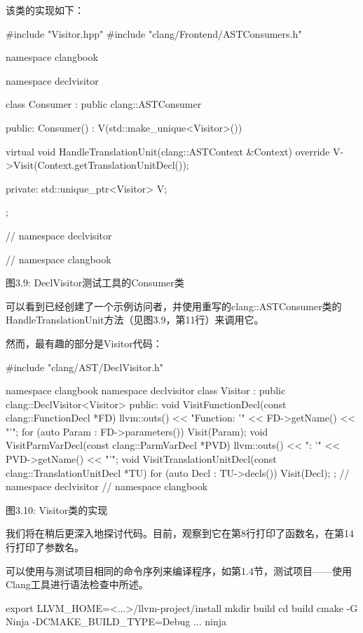 该类的实现如下：

\begin{cpp}
#include "Visitor.hpp"
#include "clang/Frontend/ASTConsumers.h"

namespace clangbook {
namespace declvisitor {
class Consumer : public clang::ASTConsumer {
public:
  Consumer() : V(std::make_unique<Visitor>()) {}

  virtual void HandleTranslationUnit(clang::ASTContext &Context) override {
    V->Visit(Context.getTranslationUnitDecl());
  }

private:
  std::unique_ptr<Visitor> V;
};
} // namespace declvisitor
} // namespace clangbook
\end{cpp}

\begin{center}
图3.9: DeclVisitor测试工具的Consumer类
\end{center}

可以看到已经创建了一个示例访问者，并使用重写的clang::ASTConsumer类的HandleTranslationUnit方法（见图3.9，第11行）来调用它。

然而，最有趣的部分是Visitor代码：

\begin{cpp}
#include "clang/AST/DeclVisitor.h"

namespace clangbook {
namespace declvisitor {
class Visitor : public clang::DeclVisitor<Visitor> {
public:
  void VisitFunctionDecl(const clang::FunctionDecl *FD) {
    llvm::outs() << "Function: '" << FD->getName() << "'\n";
    for (auto Param : FD->parameters()) {
      Visit(Param);
    }
  }
  void VisitParmVarDecl(const clang::ParmVarDecl *PVD) {
    llvm::outs() << "\tParameter: '" << PVD->getName() << "'\n";
  }
  void VisitTranslationUnitDecl(const clang::TranslationUnitDecl *TU) {
    for (auto Decl : TU->decls()) {
      Visit(Decl);
    }
  }
};
} // namespace declvisitor
} // namespace clangbook
\end{cpp}

\begin{center}
图3.10: Visitor类的实现
\end{center}

我们将在稍后更深入地探讨代码。目前，观察到它在第8行打印了函数名，在第14行打印了参数名。

可以使用与测试项目相同的命令序列来编译程序，如第1.4节，测试项目——使用Clang工具进行语法检查中所述。

\begin{shell}
export LLVM_HOME=<...>/llvm-project/install
mkdir build
cd build
cmake -G Ninja -DCMAKE_BUILD_TYPE=Debug ...
ninja
\end{shell}

